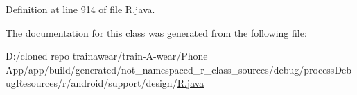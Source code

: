 Definition at line 914 of file R.\+java.



The documentation for this class was generated from the following file\+:\begin{DoxyCompactItemize}
\item 
D\+:/cloned repo trainawear/train-\/\+A-\/wear/\+Phone App/app/build/generated/not\+\_\+namespaced\+\_\+r\+\_\+class\+\_\+sources/debug/process\+Debug\+Resources/r/android/support/design/\mbox{\hyperlink{process_debug_resources_2r_2android_2support_2design_2_r_8java}{R.\+java}}\end{DoxyCompactItemize}
